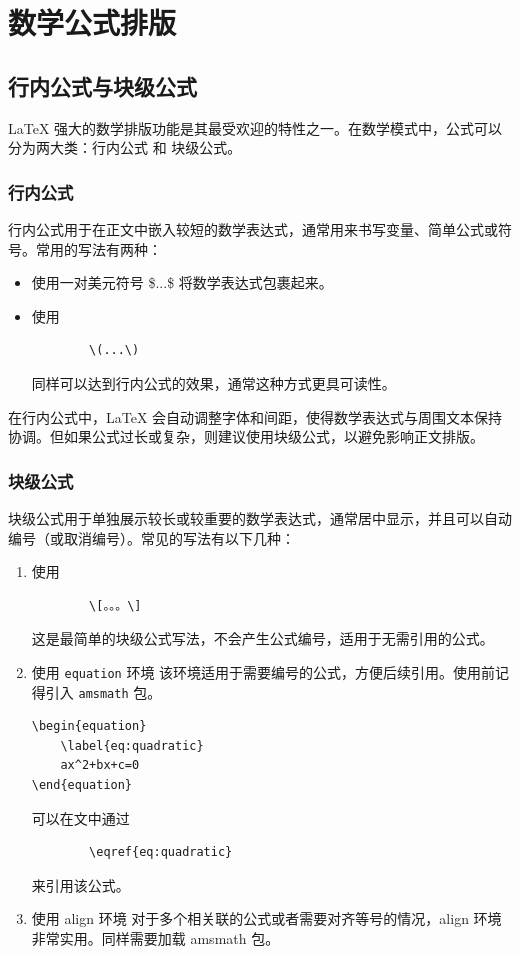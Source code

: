 \chapter{数学公式排版}

\section{行内公式与块级公式}
LaTeX 强大的数学排版功能是其最受欢迎的特性之一。在数学模式中，公式可以分为两大类：行内公式 和 块级公式。
\subsection{行内公式}
行内公式用于在正文中嵌入较短的数学表达式，通常用来书写变量、简单公式或符号。常用的写法有两种：
\begin{itemize}
	\item [美元符号法：]使用一对美元符号 \$...\$ 将数学表达式包裹起来。
	
	\item [圆括号法：]使用 \begin{lstlisting}
		\(...\)
	\end{lstlisting}同样可以达到行内公式的效果，通常这种方式更具可读性。
\end{itemize}
在行内公式中，LaTeX 会自动调整字体和间距，使得数学表达式与周围文本保持协调。但如果公式过长或复杂，则建议使用块级公式，以避免影响正文排版。

\subsection{块级公式}
块级公式用于单独展示较长或较重要的数学表达式，通常居中显示，并且可以自动编号（或取消编号）。常见的写法有以下几种：
\begin{enumerate}
	\item 使用\begin{lstlisting}
		\[。。。\]
	\end{lstlisting}这是最简单的块级公式写法，不会产生公式编号，适用于无需引用的公式。
	
	\item 使用 \texttt{equation} 环境
	该环境适用于需要编号的公式，方便后续引用。使用前记得引入 \texttt{amsmath} 包。
	\begin{lstlisting}
\begin{equation}
	\label{eq:quadratic}
	ax^2+bx+c=0
\end{equation}
	\end{lstlisting}
	可以在文中通过 \begin{lstlisting}
		\eqref{eq:quadratic}
	\end{lstlisting} 来引用该公式。
	\item 使用 align 环境
	对于多个相关联的公式或者需要对齐等号的情况，align 环境非常实用。同样需要加载 amsmath 包。
\end{enumerate}
